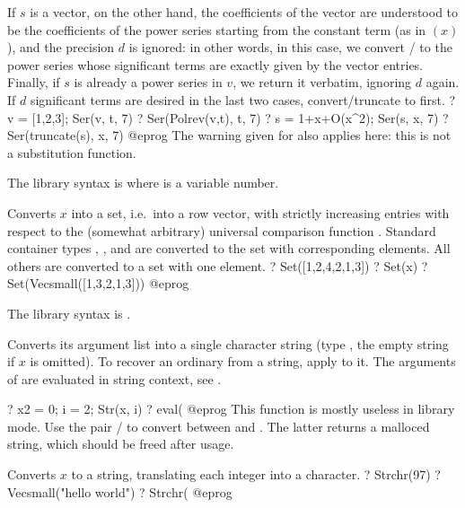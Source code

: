 If $s$ is a vector, on the other hand, the coefficients of the vector are
understood to be the coefficients of the power series starting from the
constant term (as in $(x)$), and the precision $d$ is ignored:
in other words, in this case, we convert  /  to the power
series whose significant terms are exactly given by the vector entries.
Finally, if $s$ is already a power series in $v$, we return it verbatim,
ignoring $d$ again. If $d$ significant terms are desired in the last two
cases, convert/truncate to  first.
\bprog
? v = [1,2,3]; Ser(v, t, 7)
? Ser(Polrev(v,t), t, 7)
? s = 1+x+O(x^2); Ser(s, x, 7)
? Ser(truncate(s), x, 7)
@eprog\noindent
The warning given for  also applies here: this is not a substitution
function.

The library syntax is  where  is a variable number.

\label{se:Set}
Converts $x$ into a set, i.e.~into a row vector, with strictly increasing
entries with respect to the (somewhat arbitrary) universal comparison function
. Standard container types , ,  and
 are converted to the set with corresponding elements. All
others are converted to a set with one element.
\bprog
? Set([1,2,4,2,1,3])
? Set(x)
? Set(Vecsmall([1,3,2,1,3]))
@eprog

The library syntax is .

\label{se:Str}
Converts its argument list into a
single character string (type , the empty string if $x$ is omitted).
To recover an ordinary  from a string, apply  to it. The
arguments of  are evaluated in string context, see .

\bprog
? x2 = 0; i = 2; Str(x, i)
? eval(%
@eprog\noindent
This function is mostly useless in library mode. Use the pair
/ to convert between  and .
The latter returns a malloced string, which should be freed after usage.

\label{se:Strchr}
Converts $x$ to a string, translating each integer
into a character.
\bprog
? Strchr(97)
? Vecsmall("hello world")
? Strchr(%
@eprog

